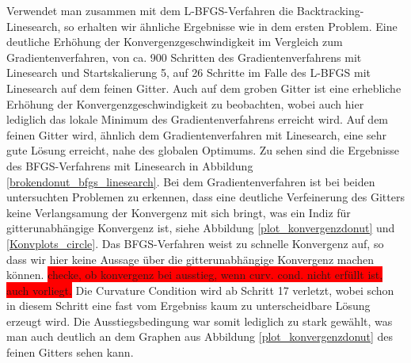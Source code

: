 Verwendet man zusammen mit dem L-BFGS-Verfahren die Backtracking-Linesearch, so erhalten wir ähnliche Ergebnisse wie in dem ersten Problem. Eine deutliche Erhöhung der Konvergenzgeschwindigkeit im Vergleich zum Gradientenverfahren, von ca. 900 Schritten des Gradientenverfahrens mit Linesearch und Startskalierung 5, auf 26 Schritte im Falle des L-BFGS mit Linesearch auf dem feinen Gitter. Auch auf dem groben Gitter ist eine erhebliche Erhöhung der Konvergenzgeschwindigkeit zu beobachten, wobei auch hier lediglich das lokale Minimum des Gradientenverfahrens erreicht wird. Auf dem feinen Gitter wird, ähnlich dem Gradientenverfahren mit Linesearch, eine sehr gute Lösung erreicht, nahe des globalen Optimums. Zu sehen sind die Ergebnisse des BFGS-Verfahrens mit Linesearch in Abbildung \ref{brokendonut_bfgs_linesearch}. Bei dem Gradientenverfahren ist bei beiden untersuchten Problemen zu erkennen, dass eine deutliche Verfeinerung des Gitters keine Verlangsamung der Konvergenz mit sich bringt, was ein Indiz für gitterunabhängige Konvergenz ist, siehe Abbildung \ref{plot_konvergenzdonut} und \ref{Konvplots_circle}. Das BFGS-Verfahren weist zu schnelle Konvergenz auf, so dass wir hier keine Aussage über die gitterunabhängige Konvergenz machen können. 
\colorbox{red}{checke, ob konvergenz bei ausstieg, wenn curv. cond. nicht erfüllt ist, auch vorliegt.}
Die Curvature Condition wird ab Schritt 17 verletzt, wobei schon in diesem Schritt eine fast vom Ergebniss kaum zu unterscheidbare Lösung erzeugt wird. Die Ausstiegsbedingung war somit lediglich zu stark gewählt, was man auch deutlich an dem Graphen aus Abbildung \ref{plot_konvergenzdonut} des feinen Gitters sehen kann. 

